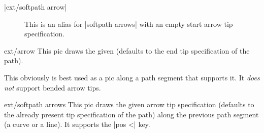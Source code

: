 \begin{multicols}{2}
\begin{description}
\item[|ext/softpath arrow|]
  This is an alias for |softpath arrows| with an empty start arrow tip specification.

\end{description}
\begin{pictype}{ext/arrow}{}
  This pic draws the given 
  (defaults to the end tip specification of the path).
  
  
  This obviously is best used as a pic along a path segment that supports it.
  It \emph{does not} support bended arrow tips.
\begin{codeexample}[preamble=\usetikzlibrary{arrows.meta, bending, ext.arrows-plus}]
\end{codeexample}
\end{pictype}

\begin{pictype}{ext/softpath arrows}{}
  This pic draws the given arrow tip specification
  (defaults to the already present tip specification of the path)
  along the previous path segment (a curve or a line).
  It supports the |pos <| key.
  

\end{pictype}
\end{multicols}
